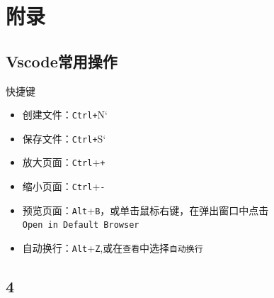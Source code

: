 \documentclass[
]{book}
\providecommand{\tightlist}{%
  \setlength{\itemsep}{0pt}\setlength{\parskip}{0pt}}
\begin{document}
\hypertarget{part-ux9644ux5f55}{%
\part{附录}\label{part-ux9644ux5f55}}

\hypertarget{vscodeux5e38ux7528ux64cdux4f5c}{%
\chapter{Vscode常用操作}\label{vscodeux5e38ux7528ux64cdux4f5c}}

快捷键

\begin{itemize}
\tightlist
\item
  创建文件：\texttt{Ctrl+}N`
\item
  保存文件：\texttt{Ctrl+}S`
\item
  放大页面：\texttt{Ctrl}+\texttt{+}
\item
  缩小页面：\texttt{Ctrl}+\texttt{-}
\item
  预览页面：\texttt{Alt}+\texttt{B}，或单击鼠标右键，在弹出窗口中点击\texttt{Open\ in\ Default\ Browser}
\item
  自动换行：\texttt{Alt}+\texttt{Z},或在\texttt{查看}中选择\texttt{自动换行}
\end{itemize}

\hypertarget{section}{%
\chapter{4}\label{section}}

\printbibliography
\end{document}
